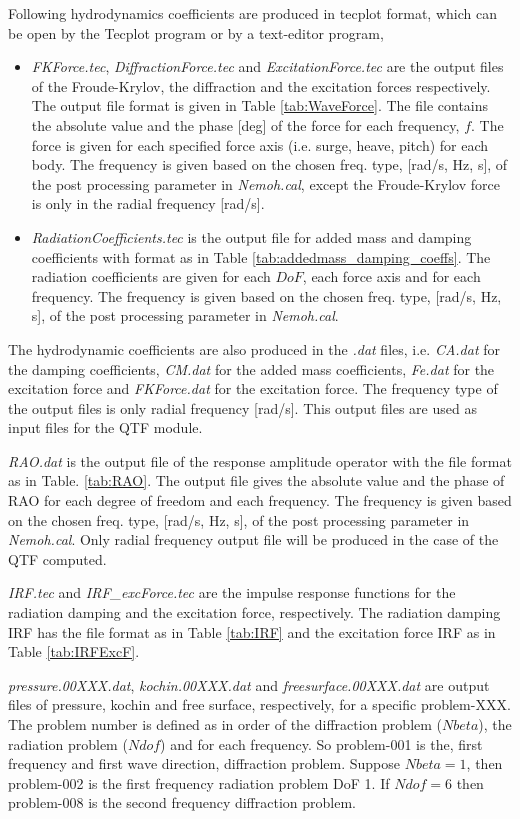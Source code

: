 \documentclass[12pt,a4paper,titlepage]{article}
\begin{document}
Following hydrodynamics coefficients are produced in tecplot format, which can be open by the Tecplot program or by a text-editor program,
\begin{itemize}
\item \textit{FKForce.tec}, \textit{DiffractionForce.tec} and \textit{ExcitationForce.tec} are the output files of the Froude-Krylov, the diffraction and the excitation forces respectively. The output file format is given in Table \ref{tab:WaveForce}. The file contains the absolute value and the phase [deg] of the force for each frequency, $f$. The force is given for each specified force axis (i.e. surge, heave, pitch) for each body.  The frequency is given based on the chosen freq. type, [rad/s, Hz, s], of the post processing parameter in \textit{Nemoh.cal}, except the Froude-Krylov force is only in the radial frequency [rad/s].
\item \textit{RadiationCoefficients.tec} is the output file for added mass and damping coefficients with format as in Table \ref{tab:addedmass_damping_coeffs}. The radiation coefficients are given for each $DoF$, each force axis and for each frequency. The frequency is given based on the chosen freq. type, [rad/s, Hz, s], of the post processing parameter in \textit{Nemoh.cal}.
\end{itemize}
The hydrodynamic coefficients are also produced in the \textit{.dat} files, i.e. \textit{CA.dat} for the damping coefficients, \textit{CM.dat} for the added mass coefficients, \textit{Fe.dat} for the excitation force and \textit{FKForce.dat} for the excitation force. The frequency type of the output files is only radial frequency [rad/s]. This output files are used as input files for the QTF module.

\textit{RAO.dat} is the output file of the response amplitude operator with the file format as in Table. \ref{tab:RAO}. The output file gives the absolute value and the phase of RAO for each degree of freedom and each frequency. The frequency is given based on the chosen freq. type, [rad/s, Hz, s], of the post processing parameter in \textit{Nemoh.cal}. Only radial frequency output file will be produced in the case of the QTF computed.

\textit{IRF.tec} and \textit{IRF\_excForce.tec} are the impulse response functions for the radiation damping and the excitation force, respectively. The radiation damping IRF has the file format as in Table \ref{tab:IRF} and the excitation force IRF as in Table \ref{tab:IRFExcF}.

\textit{pressure.00XXX.dat}, \textit{kochin.00XXX.dat} and \textit{freesurface.00XXX.dat} are output files of pressure, kochin and free surface, respectively, for a specific problem-XXX. The problem number is defined as in order of the diffraction problem ($Nbeta$), the radiation problem ($Ndof$) and for each frequency. So problem-001 is the, first frequency and first wave direction, diffraction problem. Suppose $Nbeta=1$, then problem-002 is the first frequency radiation problem DoF 1. If $Ndof=6$ then problem-008 is the second frequency diffraction problem.
\end{document}
